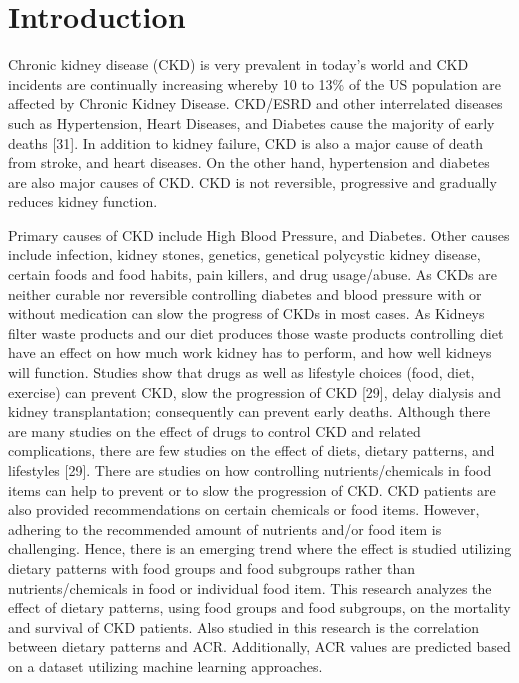 \section{Introduction}
Chronic kidney disease (CKD) is very prevalent in today’s world and CKD incidents are continually increasing whereby 10 to 13\% of the US population are affected by Chronic Kidney Disease. CKD/ESRD and other interrelated diseases such as Hypertension, Heart Diseases, and Diabetes cause the majority of early  deaths [31]. In addition to kidney failure, CKD is also a major cause of death from stroke, and heart diseases. On the other hand, hypertension and diabetes are also major causes of CKD. CKD is not reversible, progressive and gradually reduces kidney function. 

\medskip

\noindent Primary causes of CKD include High Blood Pressure, and Diabetes. Other causes include infection, kidney stones, genetics, genetical polycystic kidney disease, certain foods and food habits, pain killers, and drug usage/abuse. As CKDs are neither curable nor reversible controlling diabetes and blood pressure with or without medication can slow the progress of CKDs in most cases. As Kidneys filter waste products and our diet produces those waste products controlling diet have an effect on how much work kidney has to perform, and how well kidneys will function. Studies show that drugs as well as lifestyle choices (food, diet, exercise) can prevent CKD, slow the progression of CKD [29], delay dialysis and kidney transplantation; consequently can prevent early deaths. Although there are many studies on the effect of drugs to control CKD and related complications, there are few studies on the effect of diets, dietary patterns, and lifestyles [29]. There  are studies on how controlling nutrients/chemicals in food items can help to prevent or to slow the progression of CKD. CKD patients are also provided recommendations on certain chemicals or food items. However, adhering to the recommended amount of nutrients and/or food item is challenging. Hence, there is an emerging trend where the effect is studied utilizing  dietary patterns with food groups and food subgroups rather than nutrients/chemicals in food or individual food item. This research analyzes the effect of dietary patterns, using food groups and food subgroups, on  the mortality and survival of CKD patients. Also studied in this research is the correlation between dietary patterns and ACR. Additionally, ACR values are predicted based on a dataset utilizing machine learning approaches.

